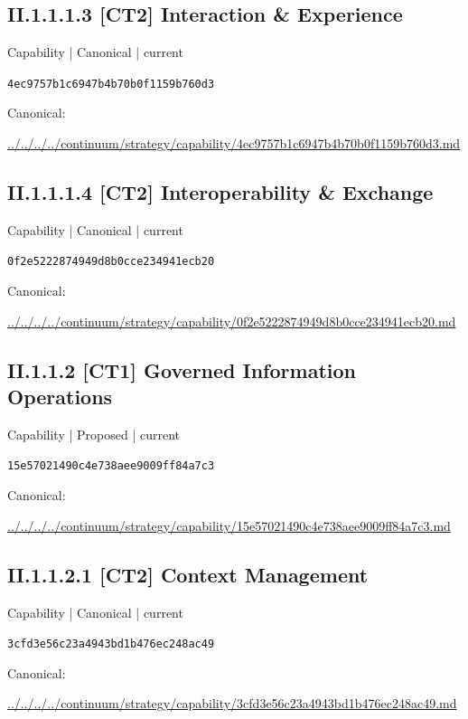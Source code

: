 \documentclass[10pt,a4paper]{article}
\begin{document}
\subsection*{II.1.1.1.3 [CT2] Interaction \& Experience}
\label{element-4ec9757b1c6947b4b70b0f1159b760d3}
{\small Capability | Canonical | current}\par
\texttt{4ec9757b1c6947b4b70b0f1159b760d3}\par
Canonical: \par
{\footnotesize\url{../../../../continuum/strategy/capability/4ec9757b1c6947b4b70b0f1159b760d3.md}}\par
\subsection*{II.1.1.1.4 [CT2] Interoperability \& Exchange}
\label{element-0f2e5222874949d8b0cce234941ecb20}
{\small Capability | Canonical | current}\par
\texttt{0f2e5222874949d8b0cce234941ecb20}\par
Canonical: \par
{\footnotesize\url{../../../../continuum/strategy/capability/0f2e5222874949d8b0cce234941ecb20.md}}\par
\subsection*{II.1.1.2 [CT1] Governed Information Operations}
\label{element-15e57021490c4e738aee9009ff84a7c3}
{\small Capability | Proposed | current}\par
\texttt{15e57021490c4e738aee9009ff84a7c3}\par
Canonical: \par
{\footnotesize\url{../../../../continuum/strategy/capability/15e57021490c4e738aee9009ff84a7c3.md}}\par
\subsection*{II.1.1.2.1 [CT2] Context Management}
\label{element-3cfd3e56c23a4943bd1b476ec248ac49}
{\small Capability | Canonical | current}\par
\texttt{3cfd3e56c23a4943bd1b476ec248ac49}\par
Canonical: \par
{\footnotesize\url{../../../../continuum/strategy/capability/3cfd3e56c23a4943bd1b476ec248ac49.md}}\par
\end{document}
